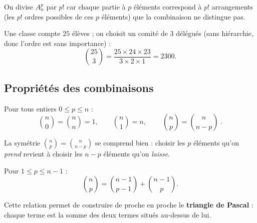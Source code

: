 \begin{remarque}
On divise $A_n^p$ par $p!$ car chaque partie à $p$ éléments correspond à $p!$
arrangements (les $p!$ ordres possibles de ces $p$ éléments) que la combinaison ne
distingue pas.
\end{remarque}

\begin{exemple}
Une classe compte $25$ élèves ; on choisit un comité de $3$ délégués (sans hiérarchie,
donc l'ordre est sans importance) :
\[ \binom{25}{3}=\frac{25\times 24\times 23}{3\times 2\times 1}=2300. \]
\end{exemple}

\subsection{Propriétés des combinaisons}

\begin{propriete}
Pour tous entiers $0\le p\le n$ :
\[ \binom{n}{0}=\binom{n}{n}=1,\qquad \binom{n}{1}=n,\qquad
   \boxed{\ \binom{n}{p}=\binom{n}{n-p}\ }. \]
\end{propriete}

\begin{remarque}
La symétrie $\binom{n}{p}=\binom{n}{n-p}$ se comprend bien : choisir les $p$ éléments
qu'on \emph{prend} revient à choisir les $n-p$ éléments qu'on \emph{laisse}.
\end{remarque}

\begin{theoreme}
Pour $1\le p\le n-1$ :
\[ \binom{n}{p}=\binom{n-1}{p-1}+\binom{n-1}{p}. \]
\end{theoreme}

Cette relation permet de construire de proche en proche le \textbf{triangle de
Pascal} : chaque terme est la somme des deux termes situés au-dessus de lui.

\begin{illus}
\end{illus}

